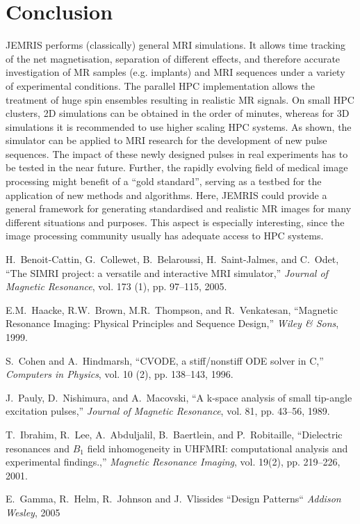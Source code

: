 \documentclass{nic-series}
\begin{document}
\section{Conclusion}
JEMRIS performs (classically) general MRI simulations. It allows time tracking of the net magnetisation, separation
of different effects, and therefore accurate investigation of MR samples (e.g. implants) and MRI sequences under a
variety of experimental conditions. The parallel HPC implementation allows the treatment of huge spin ensembles
resulting in realistic MR signals. On small HPC clusters, 2D simulations can be obtained in the order of minutes,
whereas for 3D simulations it is recommended to use higher scaling HPC systems. As shown, the simulator can be
applied to MRI research for the development of new pulse sequences. The impact of these newly designed pulses in real
experiments has to be tested in the near future.
Further, the rapidly evolving field of medical image processing might benefit of a “gold standard”, serving as a testbed
for the application of new methods and algorithms. Here, JEMRIS could provide a general framework for generating
standardised and realistic MR images for many different situations and purposes. This aspect is especially interesting,
since the image processing community usually has adequate access to HPC systems.

\begin{thebibliography}{10}
H.~Benoit-Cattin, G.~Collewet, B.~Belaroussi, H.~Saint-Jalmes, and C.~Odet,
  ``The {SIMRI} project: a versatile and interactive {MRI} simulator,''
  \emph{Journal of Magnetic Resonance}, vol. 173 (1), pp. 97--115, 2005.

E.M.~Haacke, R.W.~Brown, M.R.~Thompson, and R.~Venkatesan, ``Magnetic Resonance Imaging: Physical Principles and Sequence Design,''
  \emph{Wiley \& Sons}, 1999.

S.~Cohen and A.~Hindmarsh, ``{CVODE}, a stiff/nonstiff {ODE} solver in {C},''
  \emph{Computers in Physics}, vol. 10 (2), pp. 138--143, 1996.

J.~Pauly, D.~Nishimura, and A.~Macovski, ``A k-space analysis of small tip-angle excitation pulses,''
  \emph{Journal of Magnetic Resonance}, vol. 81, pp. 43--56, 1989.

T.~Ibrahim, R.~Lee, A.~Abduljalil, B.~Baertlein, and P.~Robitaille,
  ``Dielectric resonances and $B_1$ field inhomogeneity in {UHFMRI}:
  computational analysis and experimental findings.,''
  \emph{Magnetic Resonance Imaging}, vol. 19(2), pp. 219--226, 2001.

E.~Gamma, R.~Helm, R.~Johnson and J.~Vlissides
  ``Design Patterns``
  \emph{Addison Wesley}, 2005

\end{thebibliography}
\end{document}
